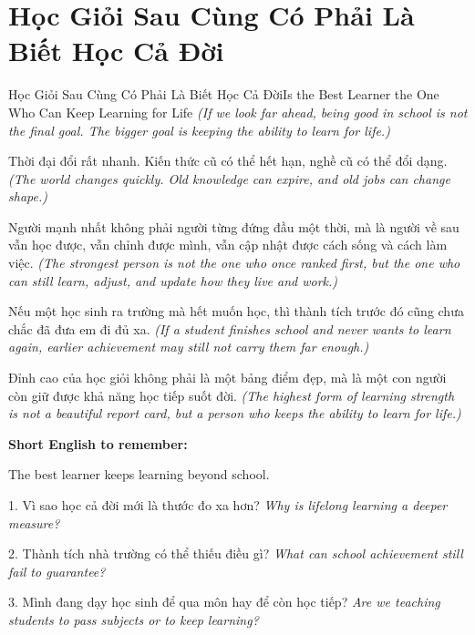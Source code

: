 \section{Học Giỏi Sau Cùng Có Phải Là Biết Học Cả Đời}
\begin{truyen}{Học Giỏi Sau Cùng Có Phải Là Biết Học Cả Đời}{Is the Best Learner the One Who Can Keep Learning for Life}
\textit{(If we look far ahead, being good in school is not the final goal. The bigger goal is keeping the ability to learn for life.)}

Thời đại đổi rất nhanh. Kiến thức cũ có thể hết hạn, nghề cũ có thể đổi dạng.
\textit{(The world changes quickly. Old knowledge can expire, and old jobs can change shape.)}

Người mạnh nhất không phải người từng đứng đầu một thời, mà là người về sau vẫn học được, vẫn chỉnh được mình, vẫn cập nhật được cách sống và cách làm việc.
\textit{(The strongest person is not the one who once ranked first, but the one who can still learn, adjust, and update how they live and work.)}

Nếu một học sinh ra trường mà hết muốn học, thì thành tích trước đó cũng chưa chắc đã đưa em đi đủ xa.
\textit{(If a student finishes school and never wants to learn again, earlier achievement may still not carry them far enough.)}
\end{truyen}

\begin{baihoc}
Đỉnh cao của học giỏi không phải là một bảng điểm đẹp, mà là một con người còn giữ được khả năng học tiếp suốt đời.
\textit{(The highest form of learning strength is not a beautiful report card, but a person who keeps the ability to learn for life.)}
\end{baihoc}

\begin{ghinhoanh}
\textbf{Short English to remember:}

The best learner keeps learning beyond school.

\end{ghinhoanh}

\begin{tuhocnhanh}
1. Vì sao học cả đời mới là thước đo xa hơn? \textit{Why is lifelong learning a deeper measure?}

2. Thành tích nhà trường có thể thiếu điều gì? \textit{What can school achievement still fail to guarantee?}

3. Mình đang dạy học sinh để qua môn hay để còn học tiếp? \textit{Are we teaching students to pass subjects or to keep learning?}
\end{tuhocnhanh}
\ngancach
